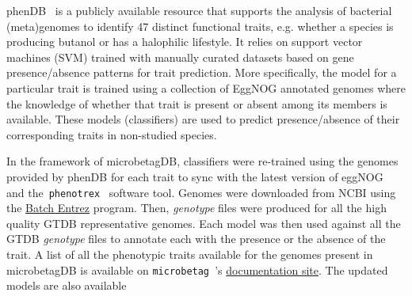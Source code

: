 \documentclass[sn-mathphys,Numbered]{sn-jnl}  %
\theoremstyle{thmstyleone}%
\theoremstyle{thmstyletwo}%
\theoremstyle{thmstylethree}%
\newcommand{\microbetag}{\texttt{microbetag }}
\begin{document}
        phenDB~\cite{feldbauer2015prediction} is a publicly available resource that supports the analysis of bacterial (meta)genomes to identify 47 distinct functional traits, e.g. whether a species is producing butanol or has a halophilic lifestyle.
        It relies on support vector machines (SVM) trained with manually curated datasets based on gene presence/absence patterns for trait prediction.
        More specifically, the model for a particular trait is trained using a collection of EggNOG annotated genomes where the knowledge of whether that trait is present or absent among its members is available.
        These models (classifiers) are used to predict presence/absence of their corresponding traits in non-studied species. 

        In the framework of microbetagDB, %
        classifiers were re-trained using the genomes provided by phenDB for each trait to sync with the latest version of eggNOG~\cite{huerta2019eggnog} and the~\texttt{phenotrex}~\cite{feldbauer2015prediction} software tool.
        Genomes were downloaded from NCBI using the \href{https://www.ncbi.nlm.nih.gov/sites/batchentrez}{Batch Entrez} program.
        Then, \textit{genotype} files were produced for all the high quality GTDB representative genomes.
        Each model was then used against all the GTDB \textit{genotype} files to annotate each with the presence or the absence of the trait. 
        A list of all the phenotypic traits available for the genomes present in microbetagDB is available on \microbetag 's \href{https://hariszaf.github.io/microbetag/docs/modules/phen-traits/}{documentation site}.
        The updated models are also available
\end{document}

